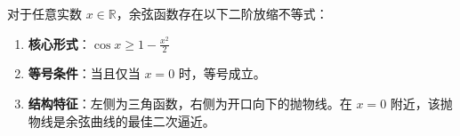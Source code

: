 \begin{statementbox}
对于任意实数 $x \in \mathbb{R}$，余弦函数存在以下二阶放缩不等式：
\begin{enumerate}
    \item \textbf{核心形式}：$\cos x \geqslant 1 - \frac{x^2}{2}$
    \item \textbf{等号条件}：当且仅当 $x = 0$ 时，等号成立。
    \item \textbf{结构特征}：左侧为三角函数，右侧为开口向下的抛物线。在 $x=0$ 附近，该抛物线是余弦曲线的最佳二次逼近。
\end{enumerate}
\end{statementbox}